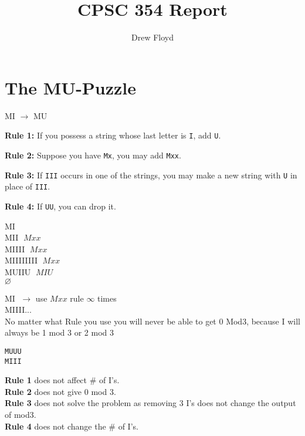 \documentclass{article}
\title{CPSC 354 Report}
\author{Drew Floyd}
\date{}
\begin{document}
\maketitle
\tableofcontents
\newpage

\section{The MU-Puzzle}

MI $\rightarrow$ MU

\textbf{Rule 1:} If you possess a string whose last letter is \texttt{I}, add \texttt{U}.

\textbf{Rule 2:} Suppose you have \texttt{Mx}, you may add \texttt{Mxx}.

\textbf{Rule 3:} If \texttt{III} occurs in one of the strings, you may make a new string with \texttt{U} in place of \texttt{III}.

\textbf{Rule 4:} If \texttt{UU}, you can drop it.

\vspace{1em}

MI \\
MII $\; Mxx$ \\
MIIII $\; Mxx$ \\
MIIIIIIII $\; Mxx$ \\
MUIIU $\; MIU$ \\
$\varnothing$

\vspace{1em}

MI $\; \rightarrow$ use $Mxx$ rule $\infty$ times \\
MIIII... \\

No matter what Rule you use you will never be able to get 0 Mod3, because I will always be 1 mod 3 or 2 mod 3

\vspace{1em}

\texttt{MUUU} \\
\texttt{MIII}

\vspace{1em}

\textbf{Rule 1} does not affect \# of I's. \\
\textbf{Rule 2} does not give 0 mod 3. \\
\textbf{Rule 3} does not solve the problem as removing 3 I's does not change the output of mod3. \\
\textbf{Rule 4} does not change the \# of I's. \\
\end{document}
